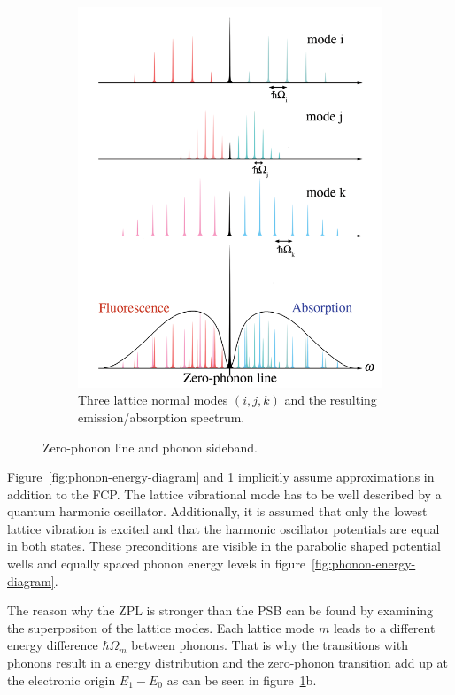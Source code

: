 \begin{figure}[H]
\begin{subfigure}[b]{0.48\textwidth}
		\includegraphics[width=\textwidth]{figures/quantum-dot/Lattice-modes}
		\caption{Three lattice normal modes $(i, j, k)$ and the resulting emission/absorption spectrum.\\}
		\label{fig:lattice-modes}
	\end{subfigure}
	\caption{Zero-phonon line and phonon sideband.~\cite{noauthor_zero-phonon_nodate}}
	\label{fig:zero-phonon-line-phonon-side-band}
\end{figure}

Figure~\ref{fig:phonon-energy-diagram} and \ref{fig:lattice-modes} implicitly assume approximations in addition to the \ac{FCP}.
The lattice vibrational mode has to be well described by a quantum harmonic oscillator.
Additionally, it is assumed that only the lowest lattice vibration is excited and that the harmonic oscillator potentials are equal in both states.
These preconditions are visible in the parabolic shaped potential wells and equally spaced phonon energy levels in figure~\ref{fig:phonon-energy-diagram}.

The reason why the \ac{ZPL} is stronger than the \ac{PSB} can be found by examining the superpositon of the lattice modes.
Each lattice mode $m$ leads to a different energy difference $\hbar \Omega_m$ between phonons.
That is why the transitions with phonons result in a energy distribution and the zero-phonon transition add up at the electronic origin $E_1 - E_0$ as can be seen in figure~\ref{fig:lattice-modes}b.

